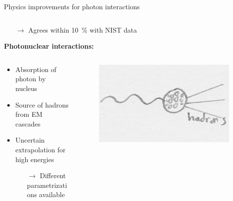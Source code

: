 \documentclass[t]{beamer}
\begin{document}
\begin{columns}[onlytextwidth]
\begin{column}{\textwidth}
\begin{block}{Physics improvements for photon interactions}
\begin{minipage}[t]{0.3\textwidth}
\begin{minipage}[t][12cm]{\textwidth}
\begin{columns}[onlytextwidth]
            \end{columns}     
            \begin{itemize}[itemindent=0.85cm,topsep=0.22cm,leftmargin=0.5cm]
                      \item[$\rightarrow$] Agrees within \SI{10}{\percent} with NIST data
            \end{itemize}     
          \end{minipage}
          \begin{minipage}[t][12cm]{\textwidth}
            {\Large\textbf{Photonuclear interactions:}}
            \begin{columns}[onlytextwidth]
                \begin{column}{0.6\textwidth}%
                  \begin{itemize}[leftmargin=0.5cm]
                    \item Absorption of photon by nucleus
                    \item Source of hadrons from EM cascades
                    \item Uncertain extrapolation for high energies
                    \begin{itemize}
                      \item[$\rightarrow$] Different parametrizations available
                    \end{itemize}
                  \end{itemize}
                \end{column}
                \begin{column}{0.35\textwidth}%
                  \begin{figure}
                      \includegraphics[width=\linewidth, keepaspectratio]{images/photoproduction_sketch.png}

\end{figure}
\end{column}
\end{columns}
\end{minipage}
\end{minipage}
\end{block}
\end{column}
\end{columns}
\end{document}
